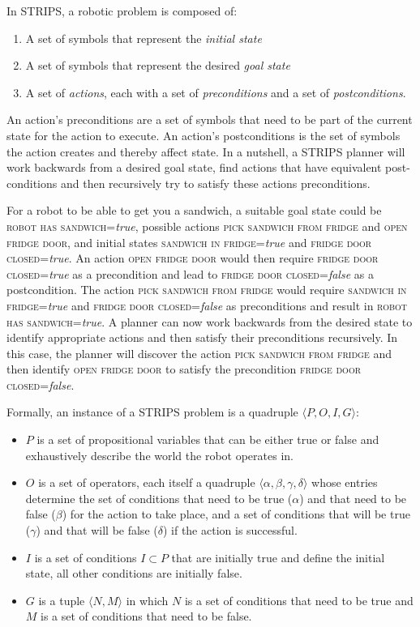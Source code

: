 In STRIPS, a robotic problem is composed of:

\begin{enumerate}
\item A set of symbols that represent the \emph{initial state}
\item A set of symbols that represent the desired \emph{goal state}
\item A set of \emph{actions}, each with a set of \emph{preconditions} and a set of \emph{postconditions}.
\end{enumerate}

An action's preconditions are a set of symbols that need to be part of the current state for the action to execute. An action's postconditions is the set of symbols the action creates and thereby affect state. In a nutshell, a STRIPS planner will work backwards from a desired goal state, find actions that have equivalent post-conditions and then recursively try to satisfy these actions preconditions.

For a robot to be able to get you a sandwich, a suitable goal state could be \textsc{robot has sandwich}=\emph{true}, possible actions \textsc{pick sandwich from fridge} and \textsc{open fridge door}, and initial states \textsc{sandwich in fridge}=\emph{true} and \textsc{fridge door closed}=\emph{true}.  An action \textsc{open fridge door} would then require \textsc{fridge door closed}=\emph{true} as a precondition and lead to \textsc{fridge door closed}=\emph{false} as a postcondition. The action \textsc{pick sandwich from fridge} would require \textsc{sandwich in fridge}=\emph{true} and \textsc{fridge door closed}=\emph{false} as preconditions and result in \textsc{robot has sandwich}=\emph{true}. A planner can now work backwards from the desired state to identify appropriate actions and then satisfy their preconditions recursively. In this case, the planner will discover the action \textsc{pick sandwich from fridge} and then identify \textsc{open fridge door} to satisfy the precondition \textsc{fridge door closed}=\emph{false}.




Formally, an instance of a STRIPS problem is a quadruple $\langle P, O, I, G \rangle$:
\begin{itemize}
\item $P$ is a set of propositional variables that can be either true or false and exhaustively describe the world the robot operates in.
\item $O$ is a set of operators, each itself a quadruple $\langle \alpha, \beta, \gamma, \delta \rangle$ whose entries determine the set of conditions that need to be true ($\alpha$) and that need to be false ($\beta$) for the action to take place, and a set of conditions that will be true ($\gamma$) and that will be false ($\delta$) if the action is successful.
\item $I$ is a set of conditions $I \subset P$ that are initially true and define the initial state, all other conditions are initially false.
\item $G$ is a tuple $\langle N, M\rangle$ in which $N$ is a set of conditions that need to be true and $M$ is a set of conditions that need to be false.
\end{itemize}

